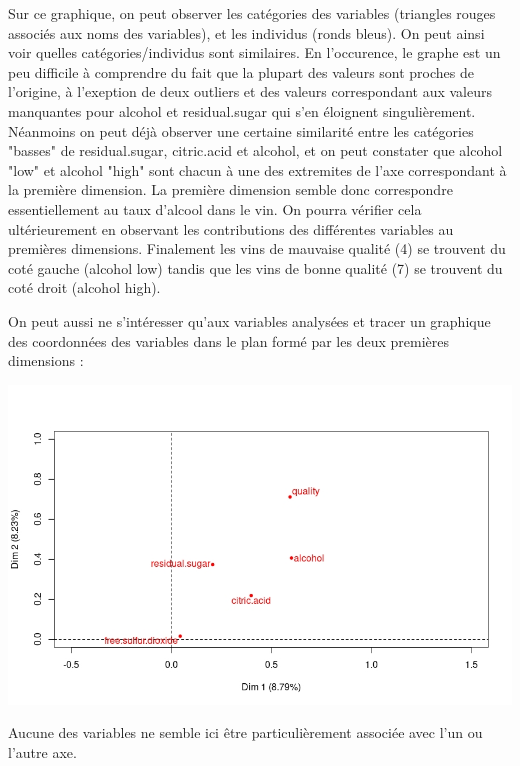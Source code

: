 \documentclass[11pt,a4paper]{article}
\begin{document}
Sur ce graphique, on peut observer les catégories des variables (triangles rouges associés aux noms des variables), et les individus (ronds bleus). On peut ainsi voir quelles catégories/individus sont similaires. En l'occurence, le graphe est un peu difficile à comprendre du fait que la plupart des valeurs sont proches de l'origine, à l'exeption de deux outliers et des valeurs correspondant aux valeurs manquantes pour alcohol et residual.sugar qui s'en éloignent singulièrement. Néanmoins on peut déjà observer une certaine similarité entre les catégories "basses" de residual.sugar, citric.acid et alcohol, et on peut constater que alcohol "low" et alcohol "high" sont chacun à une des extremites de l'axe correspondant à la première dimension. La première dimension semble donc correspondre essentiellement au taux d'alcool dans le vin. On pourra vérifier cela ultérieurement en observant les contributions des différentes variables au premières dimensions. Finalement les vins de mauvaise qualité (4) se trouvent du coté gauche (alcohol low) tandis que les vins de bonne qualité (7) se trouvent du coté droit (alcohol high). \bigskip

On peut aussi ne s'intéresser qu'aux variables analysées et tracer un graphique des coordonnées des variables dans le plan formé par les deux premières dimensions :
\begin{center}
\includegraphics[scale=0.6]{"plot-var-mca"}
\end{center}

Aucune des variables ne semble ici être particulièrement associée avec l'un ou l'autre axe.
\end{document}
